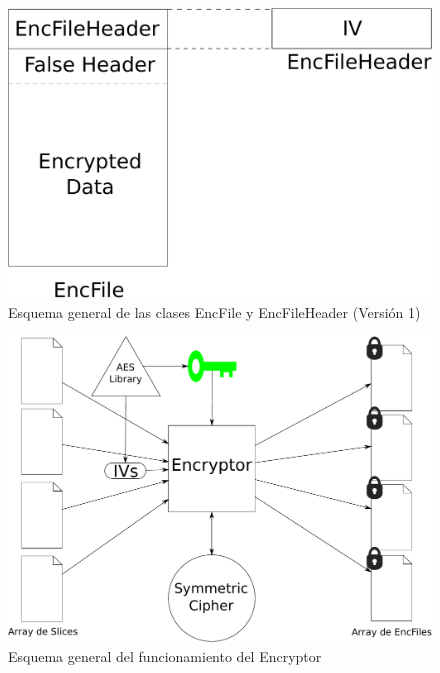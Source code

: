 \begin{figure}[ht]
  \centering
  \includegraphics[scale=0.4]{Figures/EncFile_Header_1}
  \decoRule
  \caption[EncFile - EncFileHeader (Versión 1)]{Esquema general de las clases EncFile y EncFileHeader (Versión 1)}
  \label{fig:EncFile_Header_1}
\end{figure}

\begin{figure}[ht]
  \centering
  \includegraphics[scale=0.5]{Figures/Encryptor}
  \decoRule
  \caption[Encryptor]{Esquema general del funcionamiento del Encryptor}
  \label{fig:Encryptor}
\end{figure}


